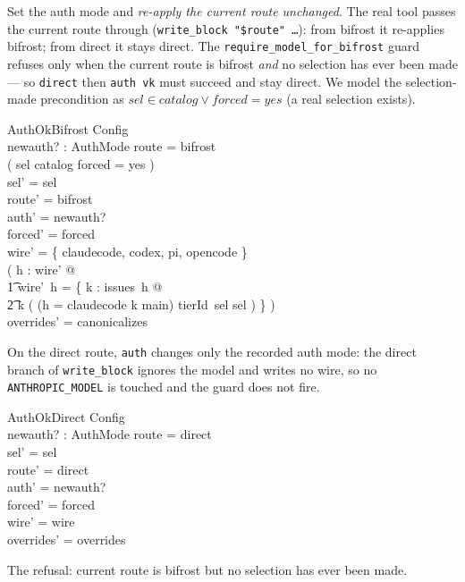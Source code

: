 \documentclass{article}
\begin{document}
Set the auth mode and \emph{re-apply the current route unchanged}. The real
tool passes the current route through (\texttt{write\_block "\$route" \ldots}):
from bifrost it re-applies bifrost; from direct it stays direct. The
\texttt{require\_model\_for\_bifrost} guard refuses only when the current route
is bifrost \emph{and} no selection has ever been made --- so \texttt{direct}
then \texttt{auth vk} must succeed and stay direct. We model the selection-made
precondition as $sel \in catalog \lor forced = yes$ (a real selection exists).

\begin{schema}{AuthOkBifrost}
  \Delta Config \\
  newauth? : AuthMode
\where
  route = bifrost \\
  ( sel \in catalog \lor forced = yes ) \\
  sel' = sel \\
  route' = bifrost \\
  auth' = newauth? \\
  forced' = forced \\
  \dom wire' = \{ claudecode, codex, pi, opencode \} \\
  ( \forall h : \dom wire' @ \\
  \t1 wire'~h = \{ k : issues~h @ \\
  \t2   k \mapsto ( \IF (h = claudecode \land k \neq main) \THEN tierId~sel \ELSE sel ) \} ) \\
  overrides' = canonicalizes
\end{schema}

On the direct route, \texttt{auth} changes only the recorded auth mode: the
direct branch of \texttt{write\_block} ignores the model and writes no wire, so
no \texttt{ANTHROPIC\_MODEL} is touched and the guard does not fire.

\begin{schema}{AuthOkDirect}
  \Delta Config \\
  newauth? : AuthMode
\where
  route = direct \\
  sel' = sel \\
  route' = direct \\
  auth' = newauth? \\
  forced' = forced \\
  wire' = wire \\
  overrides' = overrides
\end{schema}

The refusal: current route is bifrost but no selection has ever been made.
\end{document}
